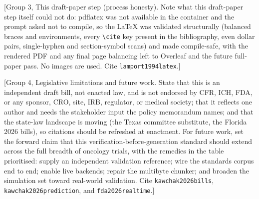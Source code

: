 [Group 3, This draft-paper step (process honesty). Note what this draft-paper step
itself could not do: pdflatex was not available in the container and the prompt
asked not to compile, so the LaTeX was validated structurally (balanced braces and
environments, every \texttt{\textbackslash cite} key present in the bibliography,
even dollar pairs, single-hyphen and section-symbol scans) and made compile-safe,
with the rendered PDF and any final page balancing left to Overleaf and the future
full-paper pass. No images are used. Cite \texttt{lamport1994latex}.]

[Group 4, Legislative limitations and future work. State that this is an
independent draft bill, not enacted law, and is not endorsed by CFR, ICH, FDA, or
any sponsor, CRO, site, IRB, regulator, or medical society; that it reflects one
author and needs the stakeholder input the policy memorandum names; and that the
state-law landscape is moving (the Texas committee substitute, the Florida 2026
bills), so citations should be refreshed at enactment. For future work, set the
forward claim that this verification-before-generation standard should extend
across the full breadth of oncology trials, with the remedies in the table
prioritised: supply an independent validation reference; wire the standards corpus
end to end; enable live backends; repair the multibyte chunker; and broaden the
simulation set toward real-world validation. Cite \texttt{kawchak2026bills},
\texttt{kawchak2026prediction}, and \texttt{fda2026realtime}.]

